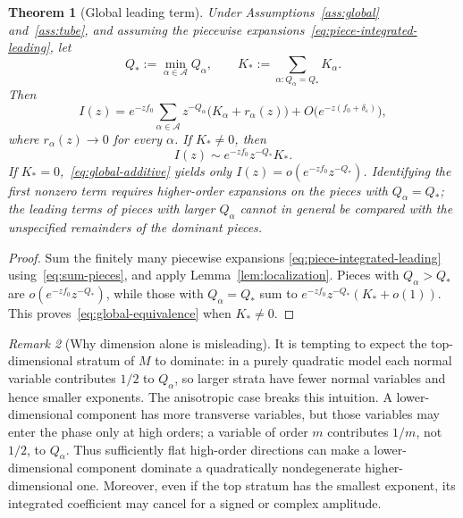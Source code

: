 \documentclass[11pt]{amsart}
\numberwithin{equation}{section}
\newtheorem{theorem}{Theorem}[section]
\theoremstyle{definition}
\theoremstyle{remark}
\newtheorem{remark}[theorem]{Remark}
\newcommand{\eps}{\varepsilon}
\newcommand{\cA}{\mathcal{A}}
\begin{document}
\begin{theorem}[Global leading term]\label{thm:global-leading}
Under Assumptions~\ref{ass:global} and~\ref{ass:tube}, and assuming the
piecewise expansions~\eqref{eq:piece-integrated-leading}, let
\begin{equation}\label{eq:Qstar}
  Q_*:=\min_{\alpha\in\cA}Q_\alpha,
  \qquad
  K_*:=\sum_{\alpha:Q_\alpha=Q_*}K_\alpha.
\end{equation}
Then
\begin{equation}\label{eq:global-additive}
 I(z)=e^{-zf_0}\sum_{\alpha\in\cA}
 z^{-Q_\alpha}\bigl(K_\alpha+r_\alpha(z)\bigr)
 +O\bigl(e^{-z(f_0+\delta_\eps)}\bigr),
\end{equation}
where $r_\alpha(z)\to0$ for every $\alpha$.  If $K_*\ne0$, then
\begin{equation}\label{eq:global-equivalence}
  I(z)\sim e^{-zf_0}z^{-Q_*}K_*.
\end{equation}
If $K_*=0$,~\eqref{eq:global-additive} yields only
$I(z)=o(e^{-zf_0}z^{-Q_*})$.  Identifying the first nonzero term requires
higher-order expansions on the pieces with $Q_\alpha=Q_*$; the leading
terms of pieces with larger $Q_\alpha$ cannot in general be compared with
the unspecified remainders of the dominant pieces.
\end{theorem}

\begin{proof}
Sum the finitely many piecewise expansions
\eqref{eq:piece-integrated-leading} using~\eqref{eq:sum-pieces}, and apply
Lemma~\ref{lem:localization}.  Pieces with $Q_\alpha>Q_*$ are
$o(e^{-zf_0}z^{-Q_*})$, while those with $Q_\alpha=Q_*$ sum to
$e^{-zf_0}z^{-Q_*}(K_*+o(1))$.  This proves~\eqref{eq:global-equivalence}
when $K_*\ne0$.
\end{proof}

\begin{remark}[Why dimension alone is misleading]
It is tempting to expect the top-dimensional stratum of $M$ to dominate: in a
purely quadratic model each normal variable contributes $1/2$ to $Q_\alpha$, so
larger strata have fewer normal variables and hence smaller exponents.  The
anisotropic case breaks this intuition.  A lower-dimensional component has
more transverse variables, but those variables may enter the phase only at high
orders; a variable of order $m$ contributes $1/m$, not $1/2$, to
$Q_\alpha$.  Thus sufficiently flat high-order directions can make a
lower-dimensional component dominate a quadratically nondegenerate
higher-dimensional one.  Moreover, even if the top stratum has the smallest
exponent, its integrated coefficient may cancel for a signed or complex
amplitude.
\end{remark}
\end{document}
